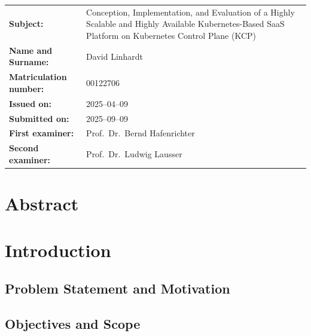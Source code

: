 \documentclass[11pt, a4paper, oneside, listof=totoc]{scrartcl}
\newcommand{\thesistitle}{Conception, Implementation, and Evaluation of a Highly Scalable and Highly Available Kubernetes-Based SaaS Platform on Kubernetes Control Plane (KCP)}
\begin{document}
\begin{titlepage}
        \begin{tabularx}{\textwidth}{@{}lX@{}}
            \textbf{Subject:} & \thesistitle\\[2cm]
            \textbf{Name and Surname:} & David Linhardt \\[0.5cm]
            \textbf{Matriculation number:} & 00122706\\[2cm]     
            \textbf{Issued on:} & 2025--04--09 \\[0.5cm]           
            \textbf{Submitted on:} & 2025--09--09 \\[2cm]           
            \textbf{First examiner:} & Prof.\ Dr.\ Bernd Hafenrichter \\[0.5cm]      
            \textbf{Second examiner:} & Prof.\ Dr.\ Ludwig Lausser \\
        \end{tabularx}

    \end{titlepage}

    \restoregeometry


    \section*{Abstract}\label{abstract}

    \newpage

    \begingroup
        \tableofcontents
    \endgroup

    \newpage

    \printglossaries{}\label{glossary}

    \newpage


    \section{Introduction}\label{sec:introduction}

        \subsection{Problem Statement and Motivation}\label{subsec:problem}

        \subsection{Objectives and Scope}\label{subsec:objectives}
\end{document}
